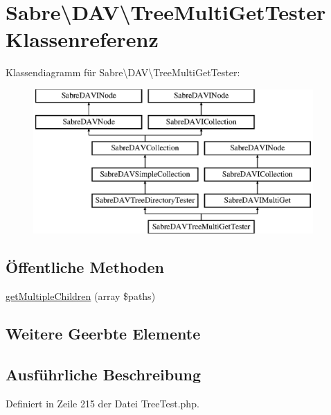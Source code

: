 \hypertarget{class_sabre_1_1_d_a_v_1_1_tree_multi_get_tester}{}\section{Sabre\textbackslash{}D\+AV\textbackslash{}Tree\+Multi\+Get\+Tester Klassenreferenz}
\label{class_sabre_1_1_d_a_v_1_1_tree_multi_get_tester}
Klassendiagramm für Sabre\textbackslash{}D\+AV\textbackslash{}Tree\+Multi\+Get\+Tester\+:\begin{figure}[H]
\begin{center}
\leavevmode
\includegraphics[height=5.517241cm]{class_sabre_1_1_d_a_v_1_1_tree_multi_get_tester}
\end{center}
\end{figure}
\subsection*{Öffentliche Methoden}
\begin{DoxyCompactItemize}
\item 
\mbox{\hyperlink{class_sabre_1_1_d_a_v_1_1_tree_multi_get_tester_a41fc2b413304bdfa1bdb6924689ca616}{get\+Multiple\+Children}} (array \$paths)
\end{DoxyCompactItemize}
\subsection*{Weitere Geerbte Elemente}


\subsection{Ausführliche Beschreibung}


Definiert in Zeile 215 der Datei Tree\+Test.\+php.



